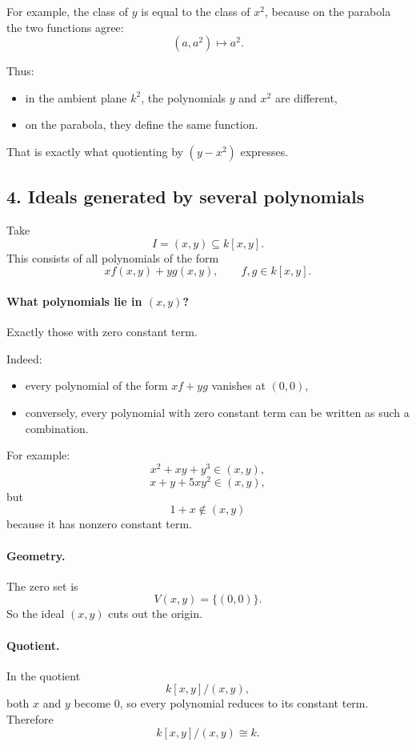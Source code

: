 \documentclass[12pt,a4paper]{article}
\theoremstyle{plain}
\theoremstyle{definition}      %
\begin{document}
	For example, the class of \(y\) is equal to the class of \(x^2\), because on the parabola the two functions agree:
	\[
	(a,a^2)\mapsto a^2.
	\]
	
	Thus:
	\begin{itemize}
		\item in the ambient plane \(k^2\), the polynomials \(y\) and \(x^2\) are different,
		\item on the parabola, they define the same function.
	\end{itemize}
	That is exactly what quotienting by \((y-x^2)\) expresses.
	
	\subsection*{4. Ideals generated by several polynomials}
	
	Take
	\[
	I=(x,y)\subseteq k[x,y].
	\]
	This consists of all polynomials of the form
	\[
	xf(x,y)+yg(x,y), \qquad f,g\in k[x,y].
	\]
	
	\paragraph{What polynomials lie in \((x,y)\)?}
	Exactly those with zero constant term.
	
	Indeed:
	\begin{itemize}
		\item every polynomial of the form \(xf+yg\) vanishes at \((0,0)\),
		\item conversely, every polynomial with zero constant term can be written as such a combination.
	\end{itemize}
	
	For example:
	\[
	x^2+xy+y^3 \in (x,y),
	\]
	\[
	x+y+5xy^2 \in (x,y),
	\]
	but
	\[
	1+x \notin (x,y)
	\]
	because it has nonzero constant term.
	
	\paragraph{Geometry.}
	The zero set is
	\[
	V(x,y)=\{(0,0)\}.
	\]
	So the ideal \((x,y)\) cuts out the origin.
	
	\paragraph{Quotient.}
	In the quotient
	\[
	k[x,y]/(x,y),
	\]
	both \(x\) and \(y\) become \(0\), so every polynomial reduces to its constant term. Therefore
	\[
	k[x,y]/(x,y)\cong k.
	\]
	
\end{document}
